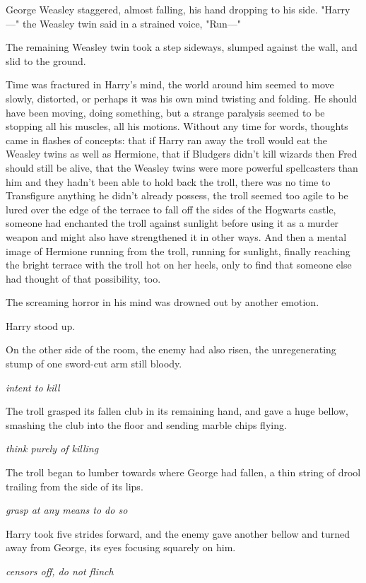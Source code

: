 George Weasley staggered, almost falling, his hand dropping to his side.
"Harry\mbox{---}" the Weasley twin said in a strained voice, "Run\mbox{---}"

The remaining Weasley twin took a step sideways, slumped against the wall, and
slid to the ground.

Time was fractured in Harry's mind, the world around him seemed to move slowly,
distorted, or perhaps it was his own mind twisting and folding. He should have
been moving, doing something, but a strange paralysis seemed to be stopping all
his muscles, all his motions. Without any time for words, thoughts came in
flashes of concepts: that if Harry ran away the troll would eat the Weasley
twins as well as Hermione, that if Bludgers didn't kill wizards then Fred
should still be alive, that the Weasley twins were more powerful spellcasters
than him and they hadn't been able to hold back the troll, there was no time to
Transfigure anything he didn't already possess, the troll seemed too agile to
be lured over the edge of the terrace to fall off the sides of the Hogwarts
castle, someone had enchanted the troll against sunlight before using it as a
murder weapon and might also have strengthened it in other ways. And then a
mental image of Hermione running from the troll, running for sunlight, finally
reaching the bright terrace with the troll hot on her heels, only to find that
someone else had thought of that possibility, too.

The screaming horror in his mind was drowned out by another emotion.

Harry stood up.

On the other side of the room, the enemy had also risen, the unregenerating
stump of one sword-cut arm still bloody.

\emph{intent to kill}

The troll grasped its fallen club in its remaining hand, and gave a huge
bellow, smashing the club into the floor and sending marble chips flying.

\emph{think purely of killing}

The troll began to lumber towards where George had fallen, a thin string of
drool trailing from the side of its lips.

\emph{grasp at any means to do so}

Harry took five strides forward, and the enemy gave another bellow and turned
away from George, its eyes focusing squarely on him.

\emph{censors off, do not flinch}

